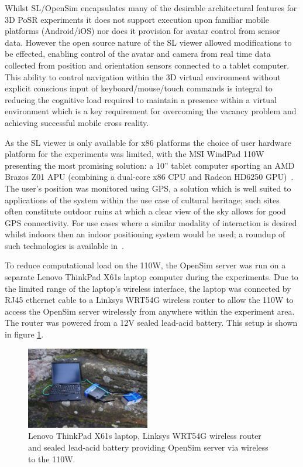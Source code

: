 Whilst SL/OpenSim encapsulates many of the desirable architectural features for 3D PoSR experiments it does not support execution upon familiar mobile platforms (Android/iOS) nor does it provision for avatar control from sensor data. However the open source nature of the SL viewer allowed modifications to be effected, enabling control of the avatar and camera from real time data collected from position and orientation sensors connected to a tablet computer. This ability to control navigation within the 3D virtual environment without explicit conscious input of keyboard/mouse/touch commands is integral to reducing the cognitive load required to maintain a presence within a virtual environment which is a key requirement for overcoming the vacancy problem and achieving successful mobile cross reality.

As the SL viewer is only available for x86 platforms the choice of user hardware platform for the experiments was limited, with the MSI WindPad 110W presenting the most promising solution: a 10'' tablet computer sporting an AMD Brazos Z01 APU (combining a dual-core x86 CPU and Radeon HD6250 GPU)~\cite{Micro-StarInt'lCo.}. The user's position was monitored using GPS, a solution which is well suited to applications of the system within the use case of cultural heritage; such sites often constitute outdoor ruins at which a clear view of the sky allows for good GPS connectivity. For use cases where a similar modality of interaction is desired whilst indoors then an indoor positioning system would be used; a roundup of such technologies is available in~\cite{Mautz2012}.

To reduce computational load on the 110W, the OpenSim server was run on a separate Lenovo ThinkPad X61s laptop computer during the experiments. Due to the limited range of the laptop's wireless interface, the laptop was connected by RJ45 ethernet cable to a Linksys WRT54G wireless router to allow the 110W to access the OpenSim server wirelessly from anywhere within the experiment area. The router was powered from a 12V sealed lead-acid battery. This setup is shown in figure \ref{server}.

\begin{figure}[h]
\centering
\includegraphics[width=0.48\textwidth]{images/server}
\caption{Lenovo ThinkPad X61s laptop, Linksys WRT54G wireless router and sealed lead-acid battery providing OpenSim server via wireless to the 110W.}
\label{server}
\end{figure}

